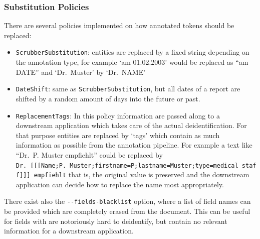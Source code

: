 \subsubsection{Substitution Policies}\label{substitution-policies}

There are several policies implemented on how annotated tokens should be
replaced:

\begin{itemize}
\tightlist
\item
  \texttt{ScrubberSubstitution}: entities are replaced by a fixed string
  depending on the annotation type, for example `am 01.02.2003' would be
  replaced as ``am DATE'' and `Dr.~Muster' by `Dr.~NAME'
\item
  \texttt{DateShift}: same as \texttt{ScrubberSubstitution}, but all
  dates of a report are shifted by a random amount of days into the
  future or past.
\item
  \texttt{ReplacementTags}: In this policy information are passed along
  to a downstream application which takes care of the actual
  deidentification. For that purpose entities are replaced by `tags'
  which contain as much information as possible from the annotation
  pipeline. For example a text like ``Dr.~P. Muster empfiehlt'' could be
  replaced by
  \texttt{Dr.\ {[}{[}{[}Name;P.\ Muster;firstname=P;lastname=Muster;type=medical\ staff{]}{]}{]}\ empfiehlt}
  that is, the original value is preserved and the downstream
  application can decide how to replace the name most appropriately.
\end{itemize}

There exist also the \texttt{-\/-fields-blacklist} option, where a list
of field names can be provided which are completely erased from the
document. This can be useful for fields with are notoriously hard to
deidentify, but contain no relevant information for a downstream
application.
